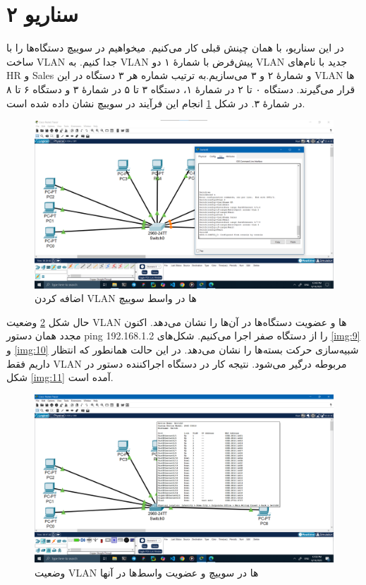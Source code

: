 \documentclass[12pt]{article}
\begin{document}
	\section{سناریو ۲}
	در این سناریو، با همان چینش قبلی کار می‌کنیم. میخواهیم در سوییچ دستگاه‌ها را با ساخت \textenglish{VLAN} جدا کنیم. به \textenglish{VLAN} پیش‌فرض با شمارهٔ ۱ دو \textenglish{VLAN} جدید با نام‌های \textenglish{HR} و \textenglish{Sales} و شمارهٔ ۲ و ۳ می‌سازیم.به ترتیب شماره هر ۳ دستگاه در این \textenglish{VLAN} ها قرار می‌گیرند. دستگاه ۰ تا ۲ در شمارهٔ ۱، دستگاه ۳ تا ۵ در شمارهٔ ۳ و دستگاه ۶ تا ۸ در شمارهٔ ۳. در شکل \ref{img:7} انجام این فرآیند در سوییچ نشان داده شده است.
	\begin{figure}[H]
		\centering
		\includegraphics[width=\textwidth]{resources/7.png}
		\caption{اضافه کردن \textenglish{VLAN} ها در واسط سوییچ}
		\label{img:7}
	\end{figure}
	حال شکل \ref{img:8} وضعیت \textenglish{VLAN} ها و عضویت دستگاه‌ها در آن‌ها را نشان می‌دهد. اکنون مجدد همان دستور \textenglish{ping 192.168.1.2} را از دستگاه صفر اجرا می‌کنیم. شکل‌های \ref{img:9} و \ref{img:10} شبیه‌سازی حرکت بسته‌ها را نشان می‌دهد. در این حالت همانطور که انتظار داریم فقط \textenglish{VLAN} مربوطه درگیر می‌شود. نتیجه کار در دستگاه اجرا‌کننده دستور در شکل \ref{img:11} آمده است.
	\begin{figure}[H]
		\centering
		\includegraphics[width=\textwidth]{resources/8.png}
		\caption{وضعیت \textenglish{VLAN} ها در سوییچ و عضویت واسط‌ها در آنها}
		\label{img:8}
	\end{figure}
\end{document}
